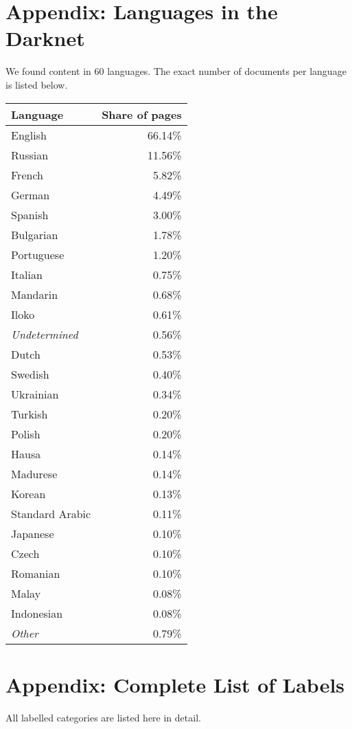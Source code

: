 \section{Appendix: Languages in the Darknet}
\label{appendix:B}
We found content in 60 languages. The exact number of documents per language is listed below.
\begin{center}
    \label{table:languages}
    \begin{supertabular}[H]{l|r}
    \textbf{Language} &	\textbf{Share of pages}	\\
    \hline
    \hline
	English		&	66.14\%\\
	\hline
	Russian		&	11.56\%\\
	\hline
	French		&	5.82\%\\
	\hline
	German		&	4.49\%\\
	\hline
	Spanish		&	3.00\%\\
	\hline
	Bulgarian	&	1.78\%\\
	\hline
	Portuguese	&	1.20\%\\
	\hline
	Italian	&	0.75\%\\
	\hline
	Mandarin	&	0.68\%\\
	\hline
	Iloko		&	0.61\%\\
	\hline
	\textit{Undetermined}	&	0.56\%\\
	\hline
	Dutch		&	0.53\%\\
	\hline
	Swedish		&	0.40\%\\
	\hline
	Ukrainian	&	0.34\%\\
	\hline
	Turkish		&	0.20\%\\
	\hline
	Polish		&	0.20\%\\
	\hline
	Hausa		&	0.14\%\\
	\hline
	Madurese	&	0.14\%\\
	\hline
	Korean		&	0.13\%\\
	\hline
	Standard Arabic	&	0.11\%\\
	\hline
	Japanese	&	0.10\%\\
	\hline
	Czech		&	0.10\%\\
	\hline
	Romanian	&	0.10\%\\
	\hline
	Malay		&	0.08\%\\
	\hline
	Indonesian	&	0.08\%\\
	\hline
	\textit{Other}		&	0.79\%\\
    \end{supertabular}
\end{center}

\section{Appendix: Complete List of Labels}
All labelled categories are listed here in detail.
